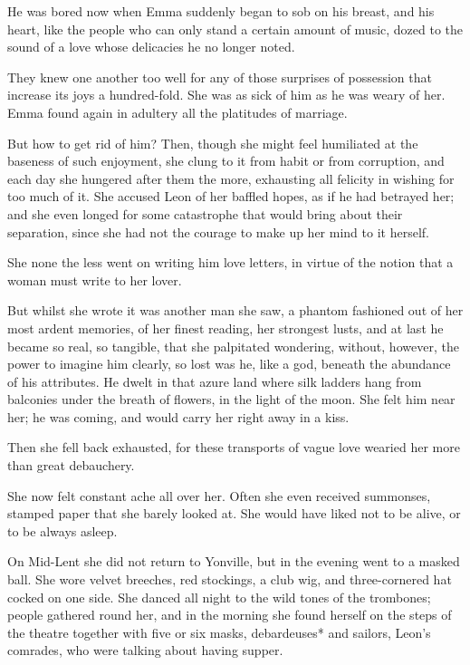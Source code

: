 \documentclass{tufte-book}
\begin{document}
He was bored now when Emma suddenly began to sob on his breast, and his
heart, like the people who can only stand a certain amount of music,
dozed to the sound of a love whose delicacies he no longer noted.

They knew one another too well for any of those surprises of possession
that increase its joys a hundred-fold. She was as sick of him as he
was weary of her. Emma found again in adultery all the platitudes of
marriage.

But how to get rid of him? Then, though she might feel humiliated at
the baseness of such enjoyment, she clung to it from habit or from
corruption, and each day she hungered after them the more, exhausting
all felicity in wishing for too much of it. She accused Leon of her
baffled hopes, as if he had betrayed her; and she even longed for some
catastrophe that would bring about their separation, since she had not
the courage to make up her mind to it herself.

She none the less went on writing him love letters, in virtue of the
notion that a woman must write to her lover.

But whilst she wrote it was another man she saw, a phantom fashioned out
of her most ardent memories, of her finest reading, her strongest
lusts, and at last he became so real, so tangible, that she palpitated
wondering, without, however, the power to imagine him clearly, so lost
was he, like a god, beneath the abundance of his attributes. He dwelt in
that azure land where silk ladders hang from balconies under the breath
of flowers, in the light of the moon. She felt him near her; he was
coming, and would carry her right away in a kiss.

Then she fell back exhausted, for these transports of vague love wearied
her more than great debauchery.

She now felt constant ache all over her. Often she even received
summonses, stamped paper that she barely looked at. She would have liked
not to be alive, or to be always asleep.

On Mid-Lent she did not return to Yonville, but in the evening went to
a masked ball. She wore velvet breeches, red stockings, a club wig, and
three-cornered hat cocked on one side. She danced all night to the wild
tones of the trombones; people gathered round her, and in the morning
she found herself on the steps of the theatre together with five or six
masks, debardeuses* and sailors, Leon's comrades, who were talking about
having supper.
\end{document}
